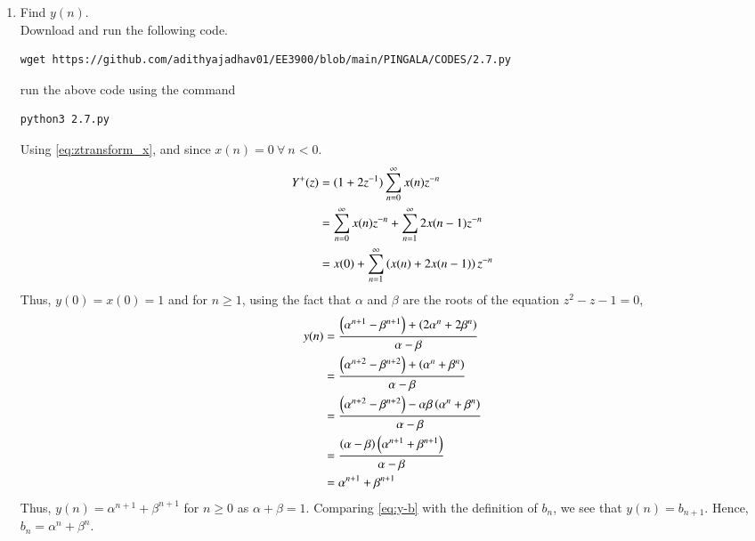 \documentclass[journal,12pt,twocolumn]{IEEEtran}
\renewcommand\thesection{\arabic{section}}
\begin{document}
\begin{enumerate}[label=\thesection.\arabic*,ref=\thesection.\theenumi]
\item Find $y(n)$.\label{pr:1-3}\\
\solution 
Download and run the following code.
\begin{lstlisting}
wget https://github.com/adithyajadhav01/EE3900/blob/main/PINGALA/CODES/2.7.py
\end{lstlisting}
run the above code using the command
\begin{lstlisting}
python3 2.7.py
\end{lstlisting}
Using \eqref{eq:ztransform_x},
 and since $x(n) = 0\ \forall\ n < 0$.
\begin{align}
    Y^+(z) &= (1 + 2z^{-1})\sum_{n = 0}^{\infty}x(n)z^{-n} \\
           &= \sum_{n = 0}^{\infty}x(n)z^{-n} + \sum_{n = 1}^{\infty}2x(n - 1)z^{-n} \\
           &= x(0) + \sum_{n = 1}^{\infty}\left(x(n) + 2x(n - 1)\right)z^{-n}
\end{align}
Thus, $y(0) = x(0) = 1$ and for $n \ge 1$, using the fact that $\alpha$ and 
$\beta$ are the roots of the equation $z^2 - z - 1 = 0$,
\begin{align}
    y(n) &= \frac{\left(\alpha^{n + 1} - \beta^{n + 1}\right) + \left(2\alpha^n + 2\beta^n\right)}{\alpha - \beta} \\
         &= \frac{\left(\alpha^{n + 2} - \beta^{n + 2}\right) + \left(\alpha^{n} + \beta^{n}\right)}{\alpha - \beta} \label{eq:y-b} \\
         &= \frac{\left(\alpha^{n + 2} - \beta^{n + 2}\right) - \alpha\beta\left(\alpha^{n} + \beta^{n}\right)}{\alpha - \beta} \\
         &= \frac{\left(\alpha - \beta\right)\left(\alpha^{n + 1} + \beta^{n + 1}\right)}{\alpha - \beta} \\
         &= \alpha^{n + 1} + \beta^{n + 1}
\end{align}
Thus, $y(n) = \alpha^{n + 1} + \beta^{n + 1}$ for $n \geq 0$ as $\alpha + \beta = 1$.
Comparing \eqref{eq:y-b} with the definition of $b_n$, we see that $y(n) = b_{n + 1}$.
Hence, $b_n = \alpha^n + \beta^n$.
\end{enumerate}
\end{document}
